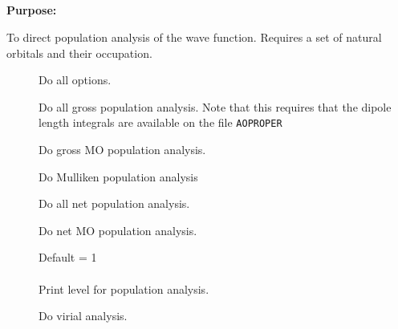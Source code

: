 \pagebreak[3]
\subsection{\label{ref-popinp}}

{\bf Purpose:}

To direct population analysis of the wave function.
Requires a set of natural orbitals and their occupation.

\begin{description}
\item[]
  Do all options.


\item[]
  Do all gross population analysis. Note that this requires that the dipole
  length integrals are available on the file \verb|AOPROPER|

\item[]
  Do gross MO population analysis.

\item[]
  Do Mulliken population analysis

\item[]
  Do all net population analysis.

\item[]
  Do net MO population analysis.

\item[]
  Default = 1\\
   \\
  Print level for population analysis.


\item[]
  Do virial analysis.
\end{description}

